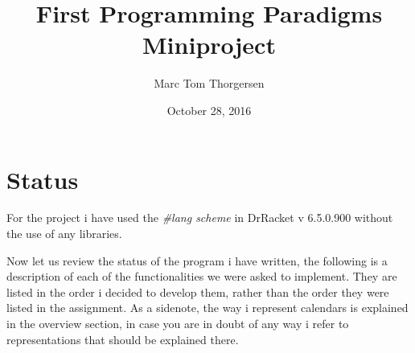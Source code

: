 \documentclass[11pt,a4paper,article,oneside]{memoir}
\title{First Programming Paradigms Miniproject}
\author{Marc Tom Thorgersen}
\date{October 28, 2016}
\begin{document}
\maketitle
\section{Status}
For the project i have used the \textit{#lang scheme} in DrRacket v 6.5.0.900 without the use of any libraries.

Now let us review the status of the program i have written, the following is a description of each of the functionalities we were asked to implement.
They are listed in the order i decided to develop them, rather than the order they were listed in the assignment.
As a sidenote, the way i represent calendars is explained in the overview section, in case you are in doubt of any way i refer to representations that should be explained there.
\end{document}
